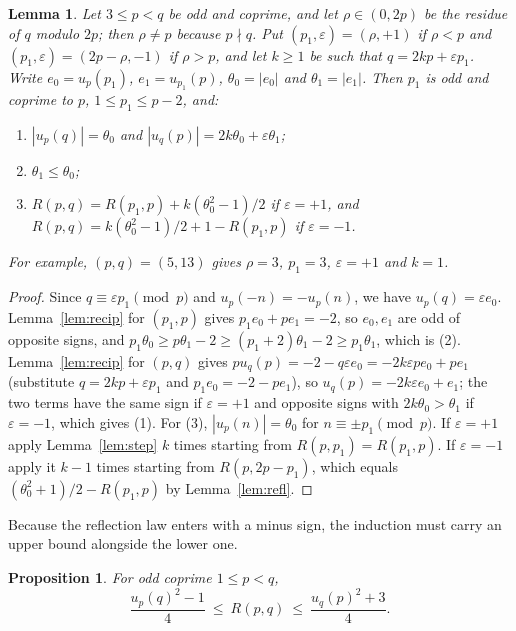 \documentclass[11pt,reqno]{amsart}
\theoremstyle{plain}
\newtheorem{proposition}[theorem]{Proposition}
\newtheorem{lemma}[theorem]{Lemma}
\theoremstyle{definition}
\begin{document}
\begin{lemma}\label{lem:euclid}
Let $3\le p<q$ be odd and coprime, and let $\rho\in(0,2p)$ be the residue of $q$ modulo $2p$; then
$\rho\neq p$ because $p\nmid q$. Put $(p_1,\varepsilon)=(\rho,+1)$ if $\rho<p$ and
$(p_1,\varepsilon)=(2p-\rho,-1)$ if $\rho>p$, and let $k\ge1$ be such that $q=2kp+\varepsilon p_1$. Write
$e_0=u_p(p_1)$, $e_1=u_{p_1}(p)$, $\theta_0=|e_0|$ and $\theta_1=|e_1|$. Then $p_1$ is odd and coprime to $p$,
$1\le p_1\le p-2$, and:
\begin{enumerate}
\item $|u_p(q)|=\theta_0$ and $|u_q(p)|=2k\theta_0+\varepsilon\theta_1$;
\item $\theta_1\le\theta_0$;
\item $R(p,q)=R(p_1,p)+k(\theta_0^2-1)/2$ if $\varepsilon=+1$, and
$R(p,q)=k(\theta_0^2-1)/2+1-R(p_1,p)$ if $\varepsilon=-1$.
\end{enumerate}
For example, $(p,q)=(5,13)$ gives $\rho=3$, $p_1=3$, $\varepsilon=+1$ and $k=1$.
\end{lemma}

\begin{proof}
Since $q\equiv\varepsilon p_1\pmod p$ and $u_p(-n)=-u_p(n)$, we have $u_p(q)=\varepsilon e_0$.
Lemma~\ref{lem:recip} for $(p_1,p)$ gives $p_1e_0+pe_1=-2$, so $e_0,e_1$ are odd of opposite signs, and
$p_1\theta_0\ge p\theta_1-2\ge(p_1+2)\theta_1-2\ge p_1\theta_1$, which is (2). Lemma~\ref{lem:recip} for
$(p,q)$ gives $pu_q(p)=-2-q\varepsilon e_0=-2k\varepsilon pe_0+pe_1$ (substitute $q=2kp+\varepsilon p_1$ and
$p_1e_0=-2-pe_1$), so $u_q(p)=-2k\varepsilon e_0+e_1$; the
two terms have the same sign if $\varepsilon=+1$ and opposite signs with $2k\theta_0>\theta_1$ if
$\varepsilon=-1$, which gives (1). For (3), $|u_p(n)|=\theta_0$ for $n\equiv\pm p_1\pmod p$. If $\varepsilon=+1$
apply Lemma~\ref{lem:step} $k$ times starting from $R(p,p_1)=R(p_1,p)$. If $\varepsilon=-1$ apply it $k-1$
times starting from $R(p,2p-p_1)$, which equals $(\theta_0^2+1)/2-R(p_1,p)$ by Lemma~\ref{lem:refl}.
\end{proof}

Because the reflection law enters with a minus sign, the induction must carry an upper bound alongside
the lower one.

\begin{proposition}\label{prop:oddodd}
For odd coprime $1\le p<q$,
\[
\frac{u_p(q)^2-1}{4}\ \le\ R(p,q)\ \le\ \frac{u_q(p)^2+3}{4}.
\]
\end{proposition}
\end{document}
